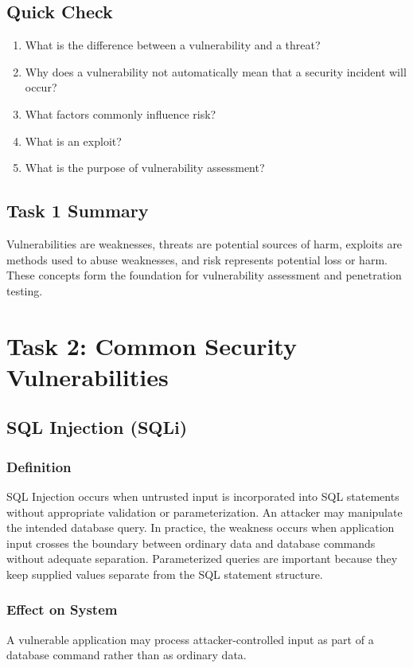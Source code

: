 \documentclass[11pt,a4paper]{article}
\begin{document}
\subsection{Quick Check}
\begin{enumerate}
\item What is the difference between a vulnerability and a threat?
\item Why does a vulnerability not automatically mean that a security incident will occur?
\item What factors commonly influence risk?
\item What is an exploit?
\item What is the purpose of vulnerability assessment?
\end{enumerate}

\subsection{Task 1 Summary}
Vulnerabilities are weaknesses, threats are potential sources of harm, exploits are methods used to abuse weaknesses, and risk represents potential loss or harm. These concepts form the foundation for vulnerability assessment and penetration testing.

\newpage
\section{Task 2: Common Security Vulnerabilities}

\subsection{SQL Injection (SQLi)}
\subsubsection{Definition}
SQL Injection occurs when untrusted input is incorporated into SQL statements without appropriate validation or parameterization. An attacker may manipulate the intended database query. In practice, the weakness occurs when application input crosses the boundary between ordinary data and database commands without adequate separation. Parameterized queries are important because they keep supplied values separate from the SQL statement structure.

\subsubsection{Effect on System}
A vulnerable application may process attacker-controlled input as part of a database command rather than as ordinary data.
\end{document}
